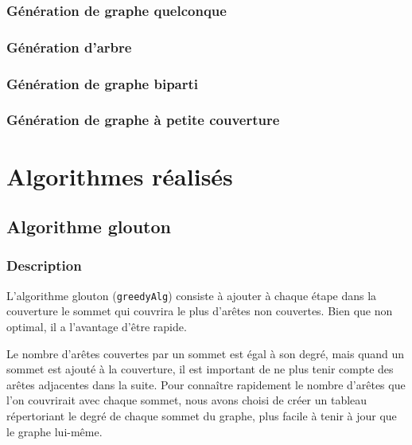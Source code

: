 \documentclass[a4paper,10pt]{article}
\begin{document}
\subsubsection{Génération de graphe quelconque}

\subsubsection{Génération d'arbre}

\subsubsection{Génération de graphe biparti}

\subsubsection{Génération de graphe à petite couverture}



\section{Algorithmes réalisés}

\subsection{Algorithme glouton}

\subsubsection{Description}

L'algorithme glouton (\texttt{greedyAlg}) consiste à ajouter à chaque étape dans la couverture le sommet qui couvrira le plus d'arêtes non couvertes. Bien que non optimal, il a l'avantage d'être rapide. 

Le nombre d'arêtes couvertes par un sommet est égal à son degré, mais quand un sommet est ajouté à la couverture, il est important de ne plus tenir compte des arêtes adjacentes dans la suite. Pour connaître rapidement le nombre d'arêtes que l'on couvrirait avec chaque sommet, nous avons choisi de créer un tableau répertoriant le degré de chaque sommet du graphe, plus facile à tenir à jour que le graphe lui-même. 
\end{document}
